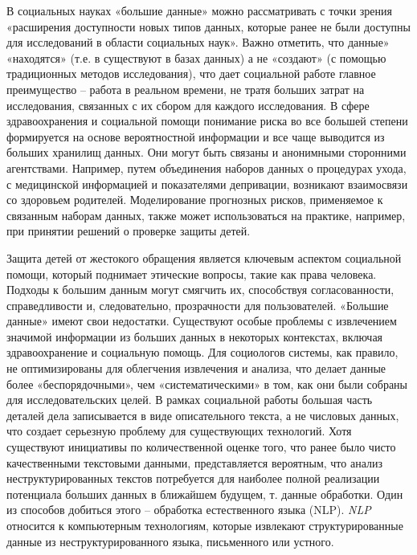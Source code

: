 \documentclass[a4paper,10pt]{article}
\begin{document}
    В социальных науках «большие данные» можно рассматривать с точки зрения «расширения доступности новых типов данных, которые ранее не были доступны для исследований в области социальных наук». 
    Важно отметить, что данные» «находятся» (т.е. в существуют в базах данных) а не «создают» (с помощью традиционных методов исследования), что дает социальной работе главное преимущество -- работа в реальном времени, не тратя больших затрат на исследования, связанных с их сбором для каждого исследования. 
    В сфере здравоохранения и социальной помощи понимание риска во все большей степени формируется на основе вероятностной информации и все чаще выводится из больших хранилищ данных. 
    Они могут быть связаны и анонимными сторонними агентствами. 
    Например, путем объединения наборов данных о процедурах ухода, с медицинской информацией и показателями депривации, возникают взаимосвязи со здоровьем родителей. 
    Моделирование прогнозных рисков, применяемое к связанным наборам данных, также может использоваться на практике, например, при принятии решений о проверке защиты детей.
    \par\hrulefill\par
    Защита детей от жестокого обращения является ключевым аспектом социальной помощи, который поднимает этические вопросы, такие как права человека. 
    Подходы к большим данным могут смягчить их, способствуя согласованности, справедливости и, следовательно, прозрачности для пользователей. 
    «Большие данные» имеют свои недостатки. 
    Существуют особые проблемы с извлечением значимой информации из больших данных в некоторых контекстах, включая здравоохранение и социальную помощь. 
    Для социологов системы, как правило, не оптимизированы для облегчения извлечения и анализа, что делает данные более «беспорядочными», чем «систематическими» в том, как они были собраны для исследовательских целей. 
    В рамках социальной работы большая часть деталей дела записывается в виде описательного текста, а не числовых данных, что создает серьезную проблему для существующих технологий. 
    Хотя существуют инициативы по количественной оценке того, что ранее было чисто качественными текстовыми данными, представляется вероятным, что анализ неструктурированных текстов потребуется для наиболее полной реализации потенциала больших данных в ближайшем будущем, т. данные обработки. 
    Один из способов добиться этого -- обработка естественного языка (NLP). \textit{NLP} относится к компьютерным технологиям, которые извлекают структурированные данные из неструктурированного языка, письменного или устного. 
\end{document}
